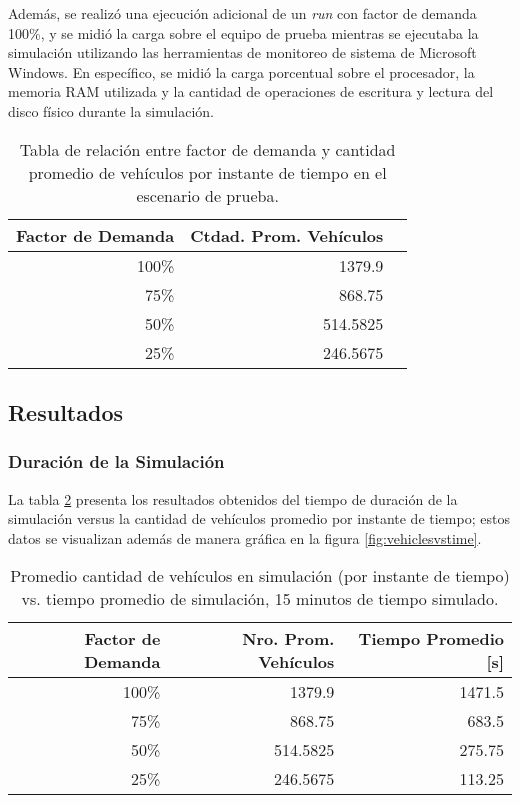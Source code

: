 Además, se realizó una ejecución adicional de un \emph{run} con factor de demanda 100\%, y se midió la carga sobre el equipo de prueba mientras se ejecutaba la simulación utilizando las herramientas de monitoreo de sistema de Microsoft Windows. En específico, se midió la carga porcentual sobre el procesador, la memoria RAM utilizada y la cantidad de operaciones de escritura y lectura del disco físico durante la simulación.

\begin{table}[htpb]
    \centering
    \begin{tabular}{@{}rrr@{}}
        \textbf{Factor de Demanda} & \textbf{Ctdad. Prom. Vehículos} \\ \midrule
        100\%           & 1379.9 \\ %
        75\%            & 868.75 \\ %
        50\%            & 514.5825 \\ %
        25\%            & 246.5675 \\ \bottomrule
    \end{tabular}
    \caption[Factor de demanda vs. cantidad promedio de vehículos]{Tabla de relación entre factor de demanda y cantidad promedio de vehículos por instante de tiempo en el escenario de prueba.}
    \label{table:demandfactor}
\end{table}

\subsection{Resultados}

\subsubsection{Duración de la Simulación}

La tabla \ref{table:vehiclesvstime} presenta los resultados obtenidos del tiempo de duración de la simulación versus la cantidad de vehículos promedio por instante de tiempo; estos datos se visualizan además de manera gráfica en la figura \ref{fig:vehiclesvstime}.

\begin{table}[htpb]
    \centering
    \begin{tabular}{@{}rrr@{}}
        \textbf{Factor de Demanda} & \textbf{Nro. Prom. Vehículos} & \textbf{Tiempo Promedio [s]} \\ \midrule
        100\%           & 1379.9          & 1471.5              \\ %
        75\%            & 868.75          & 683.5               \\ %
        50\%            & 514.5825        & 275.75              \\ %
        25\%            & 246.5675        & 113.25              \\ \bottomrule
    \end{tabular}
    \caption[Cantidad de vehículos vs. tiempo real de simulación]{Promedio cantidad de vehículos en simulación (por instante de tiempo) vs. tiempo promedio de simulación, 15 minutos de tiempo simulado.}
    \label{table:vehiclesvstime}
\end{table}

